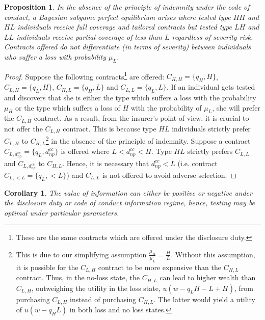 \documentclass[natbib=false,preprint,12pt]{elsarticle}
\theoremstyle{plain}
\newtheorem{corollary}[theorem]{Corollary}
\newtheorem{prop}[theorem]{Proposition}
\theoremstyle{definition}
\theoremstyle{plain}
\theoremstyle{TheoremNum}
\theoremstyle{CorollaryNum}
\theoremstyle{PropositionNum}
\theoremstyle{TheoremNum}
\begin{document}
\setcounter{theorem}{7}
\renewcommand{\thetheorem}{\arabic{theorem}}
\begin{prop}
In the absence of the principle of indemnity under the code of conduct, a Bayesian subgame perfect equilibrium arises where tested type $HH$ and $HL$ individuals receive full coverage and tailored contracts but tested type $LH$ and $LL$ individuals receive partial coverage of less than $L$ regardless of severity risk. Contracts offered do not differentiate (in terms of severity) between individuals who suffer a loss with probability $\mu_L$.
\end{prop}

\begin{proof}
Suppose the following contracts\footnote{These are the same contracts which are offered under the disclosure duty.} are offered: $C_{H,H}=\{q_H, H\}$, $C_{L,H}=\{q_L, H\}$, $C_{H,L}=\{q_H, L\}$ and $C_{L,L}=\{q_L, L\}$. If an individual gets tested and discovers that she is either the type which suffers a loss with the probability $\mu_H$ or the type which suffers a loss of $H$ with the probability of $\mu_L$, she will prefer the $C_{L,H}$ contract. As a result, from the insurer's point of view, it is crucial to not offer the $C_{L,H}$ contract. This is because type $HL$ individuals strictly prefer $C_{L,H}$ to $C_{H,L}$\footnote{This is due to our simplifying assumption $\frac{\mu_H}{\mu_L} = \frac{H}{L}$. Without this assumption, it is possible for the $C_{L,H}$ contract to be more expensive than the $C_{H,L}$ contract. Thus, in the no-loss state, the $C_{H,L}$ can lead to higher wealth than $C_{L,H}$, outweighing the utility in the loss state, $u(w-q_L H -L + H)$, from purchasing $C_{L,H}$ instead of purchasing $C_{H,L}$. The latter would yield a utility of $u(w-q_H L)$ in both loss and no loss states.} in the absence of the principle of indemnity. Suppose a contract $C_{L,d_{np}^{cc}} = \{q_L, d_{np}^{cc}\}$ is offered where $L<d_{np}^{cc}<H$. Type $HL$ strictly prefers $C_{L,L}$ and $C_{L,d_{np}^{cc}}$ to $C_{H,L}$. Hence, it is necessary that $d_{np}^{cc} < L$ (i.e. contract $C_{L,<L} = \{q_L, <L\}$) and $C_{L,L}$ is not offered to avoid adverse selection.
\end{proof}

\setcounter{theorem}{1}
\renewcommand{\thetheorem}{\arabic{theorem}}
\begin{corollary}
The value of information can either be positive or negative under the disclosure duty or code of conduct information regime, hence, testing may be optimal under particular parameters.  
\end{corollary}
\end{document}
